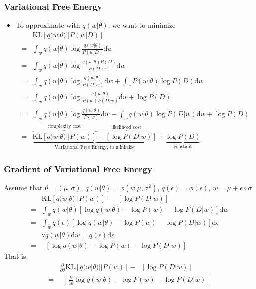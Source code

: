 \begin{frame}
  \frametitle{Variational Free Energy}
  \begin{itemize}
  \item To approximate with $q(w | \theta)$, we want to minimize
    \begin{align*}
       & \mathrm{KL}[q(w | \theta) || P(w | D)] \\
      =& \int_w q(w | \theta) \log \frac{q(w | \theta)}{P(w | D)} \mathrm{d} w \\
      =& \int_w q(w | \theta) \log \frac{q(w | \theta) P(D)}{P(D, w)} \mathrm{d} w \\
      =& \int_w q(w | \theta) \log \frac{q(w | \theta)}{P(D, w)} \mathrm{d} w +
      \int_w P(w | \theta) \log P(D) \mathrm{d} w\\
      =& \int_w q(w | \theta) \log \frac{q(w | \theta)}{P(w) P(D | w)} \mathrm{d} w + \log P(D) \\
      =& \int_w q(w | \theta) \log \frac{q(w | \theta)}{P(w)} \mathrm{d} w
         - \int_w q(w | \theta) \log P(D | w) \mathrm{d} w + \log P(D) \\
      =& \underbrace{
             \overbrace{\mathrm{KL}[q(w | \theta) || P(w)]}^{\text{complexity cost}}
             \overbrace{-\mathop{\mathbb{E}_{q(w | \theta)}}[\log P(D | w)]}^{\text{likelihood cost}}
         }_{\text{Variational Free Energy, to minimize}}
         + \underbrace{\log P(D)}_{\text{constant}}
    \end{align*}
  \end{itemize}
\end{frame}


\begin{frame}
  \frametitle{Gradient of Variational Free Energy}
  Assume that $\theta = (\mu, \sigma)$, $q(w | \theta) = \phi(w | \mu, \sigma^2)$, $q(\epsilon) = \phi(\epsilon)$, $w = \mu + \epsilon \circ \sigma$
  \begin{align*}
     & \mathrm{KL}[q(w | \theta) || P(w)] - \mathop{\mathbb{E}_{q(w | \theta)}}[\log P(D | w)] \\
    =& \int_w q(w | \theta) [\log q(w | \theta) - \log P(w) - \log P(D | w)] \mathrm{d} w \\
    =& \int_w q(\epsilon) [\log q(w | \theta) - \log P(w) - \log P(D | w)] \mathrm{d} \epsilon \\
     & \because q(w | \theta) \mathrm{d}w = q(\epsilon) \mathrm{d}\epsilon \\
    =& \mathop{\mathbb{E}_\epsilon }[\log q(w | \theta) - \log P(w) - \log P(D | w)]
  \end{align*}
  That is,
  \begin{align*}
     & \frac{\partial}{\partial \theta} \mathrm{KL}[q(w | \theta) || P(w)] - \mathop{\mathbb{E}_{q(w | \theta)}}[\log P(D | w)] \\
    =& \mathop{\mathbb{E}_\epsilon }[\frac{\partial}{\partial \theta} \log q(w | \theta) - \log P(w) - \log P(D | w)]
  \end{align*}
  
\end{frame}